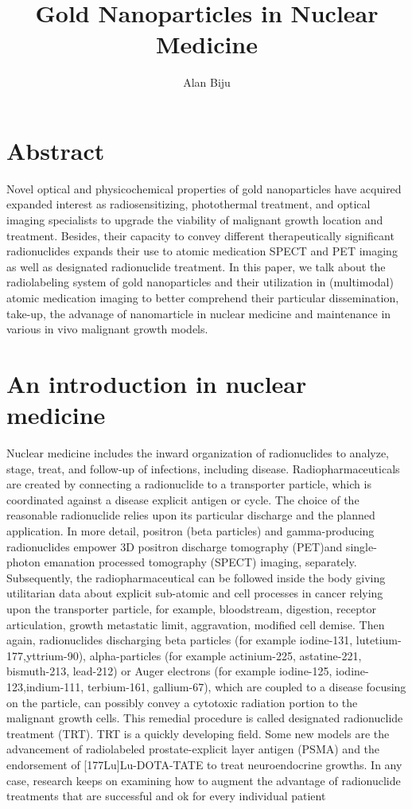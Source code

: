 \documentclass{article}
\begin{document}
\title{Gold Nanoparticles in Nuclear Medicine }
\author{Alan Biju}


\maketitle


\section*{Abstract}

Novel optical and physicochemical properties of gold nanoparticles have acquired expanded interest as radiosensitizing, photothermal treatment, and optical imaging specialists to upgrade the viability of malignant growth location and treatment. Besides, their capacity to convey different therapeutically significant radionuclides expands their use to atomic medication SPECT and PET imaging as well as designated radionuclide treatment. In this paper, we talk about the radiolabeling system of gold nanoparticles and their utilization in (multimodal) atomic medication imaging to better comprehend their particular dissemination, take-up, the advanage of nanomarticle in nuclear medicine and maintenance in various in vivo malignant growth models.


\section*{ An introduction in nuclear medicine}
Nuclear medicine includes the inward organization of radionuclides to analyze, stage, treat, and follow-up of infections, including disease. Radiopharmaceuticals are created by connecting a radionuclide to a transporter particle, which is coordinated against a disease explicit antigen or cycle. The choice of the
reasonable radionuclide relies upon its particular discharge and the planned application. In more detail, positron (beta particles) and gamma-producing radionuclides empower 3D positron discharge tomography (PET)and single-photon emanation processed tomography (SPECT) imaging, separately. Subsequently, the radiopharmaceutical can be followed inside the body giving utilitarian data about explicit sub-atomic and cell processes in cancer relying upon the transporter particle, for example, bloodstream, digestion, receptor articulation, growth metastatic limit, aggravation, modified cell demise. Then again, radionuclides discharging beta particles (for example iodine-131, lutetium-177,yttrium-90), alpha-particles (for example actinium-225, astatine-221, bismuth-213, lead-212) or Auger electrons (for example iodine-125, iodine-123,indium-111, terbium-161, gallium-67), which are coupled to a disease focusing on the particle, can possibly convey a cytotoxic radiation portion to the malignant growth cells. This remedial procedure is called designated radionuclide treatment (TRT). TRT is a quickly developing field. Some new models are the advancement of radiolabeled prostate-explicit layer antigen (PSMA) and the endorsement of [177Lu]Lu-DOTA-TATE to treat neuroendocrine growths. In any case, research keeps on examining how to augment the advantage of radionuclide treatments that are successful and ok for every individual patient
\end{document}

